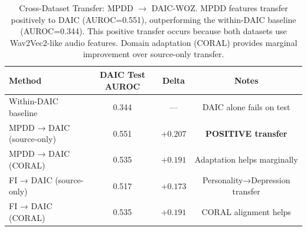 \begin{table}[htbp]
\centering
\caption{Cross-Dataset Transfer: MPDD $\rightarrow$ DAIC-WOZ. MPDD features transfer positively to DAIC (AUROC=0.551), outperforming the within-DAIC baseline (AUROC=0.344). This positive transfer occurs because both datasets use Wav2Vec2-like audio features. Domain adaptation (CORAL) provides marginal improvement over source-only transfer.}
\label{tab:cross_dataset_results}
\begin{tabular}{lccc}
\toprule
\textbf{Method} & \textbf{DAIC Test AUROC} & \textbf{Delta} & \textbf{Notes} \\
\midrule
Within-DAIC baseline & 0.344 & — & DAIC alone fails on test \\
MPDD → DAIC (source-only) & 0.551 & $+0.207$ & \textbf{POSITIVE transfer} \\
MPDD → DAIC (CORAL) & 0.535 & $+0.191$ & Adaptation helps marginally \\
\midrule
FI → DAIC (source-only) & 0.517 & $+0.173$ & Personality→Depression transfer \\
FI → DAIC (CORAL) & 0.535 & $+0.191$ & CORAL alignment helps \\
\bottomrule
\end{tabular}
\end{table}